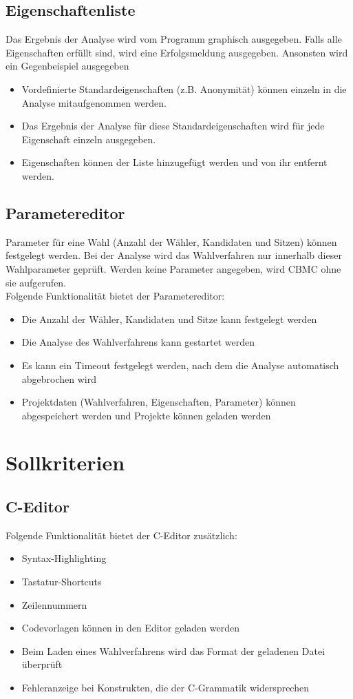 \documentclass[a4paper]{scrreprt}
\begin{document}
\subsection{Eigenschaftenliste}
Das Ergebnis der Analyse wird vom Programm graphisch ausgegeben. Falls alle Eigenschaften erfüllt sind, wird eine Erfolgsmeldung ausgegeben. Ansonsten wird ein Gegenbeispiel ausgegeben
\begin{itemize}
	\item Vordefinierte Standardeigenschaften (z.B. Anonymität) können einzeln in die Analyse mitaufgenommen werden.
	\item Das Ergebnis der Analyse für diese Standardeigenschaften wird für jede Eigenschaft einzeln ausgegeben.
	\item Eigenschaften können der Liste hinzugefügt werden und von ihr entfernt werden.
\end{itemize}

\subsection{Parametereditor}
Parameter für eine Wahl (Anzahl der Wähler, Kandidaten und Sitzen) können festgelegt werden. Bei der Analyse wird das Wahlverfahren nur innerhalb dieser Wahlparameter geprüft. Werden keine Parameter angegeben, wird \ac{CBMC} ohne sie aufgerufen.\\
Folgende Funktionalität bietet der Parametereditor:
\begin{itemize}
	\item Die Anzahl der Wähler, Kandidaten und Sitze kann festgelegt werden
	\item Die Analyse des Wahlverfahrens kann gestartet werden
	\item Es kann ein Timeout festgelegt werden, nach dem die Analyse automatisch abgebrochen wird
	\item Projektdaten (Wahlverfahren, Eigenschaften, Parameter) können abgespeichert werden und Projekte können geladen werden
\end{itemize}




\section{Sollkriterien}
\subsection{C-Editor}
Folgende Funktionalität bietet der C-Editor zusätzlich:
\begin{itemize}
	\item Syntax-Highlighting
	\item Tastatur-Shortcuts
	\item Zeilennummern
	\item Codevorlagen können in den Editor geladen werden
	\item Beim Laden eines Wahlverfahrens wird das Format der geladenen Datei überprüft
	\item Fehleranzeige bei Konstrukten, die der C-Grammatik widersprechen
\end{itemize}
\end{document}
